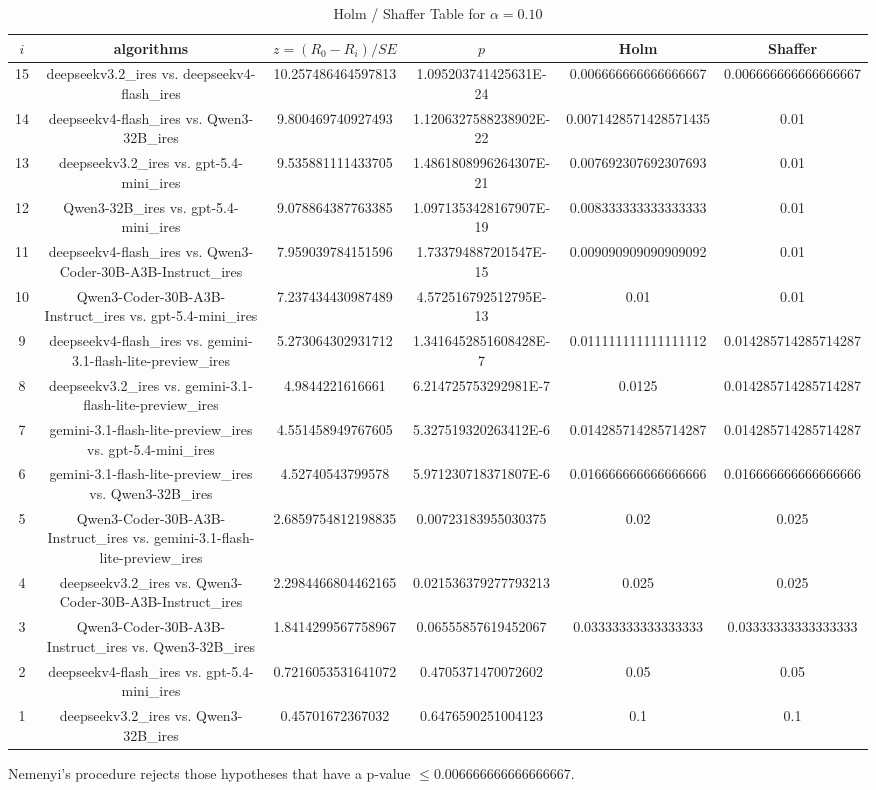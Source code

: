 \documentclass[a4paper,10pt]{article}
\begin{document}
\begin{landscape}
\begin{table}[!htp]
\centering\tiny
\caption{Holm / Shaffer Table for $\alpha=0.10$}
\begin{tabular}{cccccc}
$i$&algorithms&$z=(R_0 - R_i)/SE$&$p$&Holm&Shaffer\\
\hline
15&deepseekv3.2_ires vs. deepseekv4-flash_ires&10.257486464597813&1.095203741425631E-24&0.006666666666666667&0.006666666666666667\\14&deepseekv4-flash_ires vs. Qwen3-32B_ires&9.800469740927493&1.1206327588238902E-22&0.0071428571428571435&0.01\\13&deepseekv3.2_ires vs. gpt-5.4-mini_ires&9.535881111433705&1.4861808996264307E-21&0.007692307692307693&0.01\\12&Qwen3-32B_ires vs. gpt-5.4-mini_ires&9.078864387763385&1.0971353428167907E-19&0.008333333333333333&0.01\\11&deepseekv4-flash_ires vs. Qwen3-Coder-30B-A3B-Instruct_ires&7.959039784151596&1.733794887201547E-15&0.009090909090909092&0.01\\10&Qwen3-Coder-30B-A3B-Instruct_ires vs. gpt-5.4-mini_ires&7.237434430987489&4.572516792512795E-13&0.01&0.01\\9&deepseekv4-flash_ires vs. gemini-3.1-flash-lite-preview_ires&5.273064302931712&1.3416452851608428E-7&0.011111111111111112&0.014285714285714287\\8&deepseekv3.2_ires vs. gemini-3.1-flash-lite-preview_ires&4.9844221616661&6.214725753292981E-7&0.0125&0.014285714285714287\\7&gemini-3.1-flash-lite-preview_ires vs. gpt-5.4-mini_ires&4.551458949767605&5.327519320263412E-6&0.014285714285714287&0.014285714285714287\\6&gemini-3.1-flash-lite-preview_ires vs. Qwen3-32B_ires&4.52740543799578&5.971230718371807E-6&0.016666666666666666&0.016666666666666666\\5&Qwen3-Coder-30B-A3B-Instruct_ires vs. gemini-3.1-flash-lite-preview_ires&2.6859754812198835&0.00723183955030375&0.02&0.025\\4&deepseekv3.2_ires vs. Qwen3-Coder-30B-A3B-Instruct_ires&2.2984466804462165&0.021536379277793213&0.025&0.025\\3&Qwen3-Coder-30B-A3B-Instruct_ires vs. Qwen3-32B_ires&1.8414299567758967&0.06555857619452067&0.03333333333333333&0.03333333333333333\\2&deepseekv4-flash_ires vs. gpt-5.4-mini_ires&0.7216053531641072&0.4705371470072602&0.05&0.05\\1&deepseekv3.2_ires vs. Qwen3-32B_ires&0.45701672367032&0.6476590251004123&0.1&0.1\\\hline
\end{tabular}
\end{table}
Nemenyi's procedure rejects those hypotheses that have a p-value $\le0.006666666666666667$.



\end{landscape}
\end{document}
